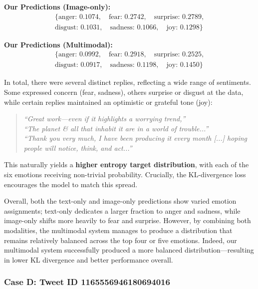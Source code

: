 \noindent\textbf{Our Predictions (Image-only):}
\[
\begin{aligned}
\{\text{anger: } 0.1074, \quad \text{fear: } 0.2742, \quad \text{surprise: } 0.2789, \\
\text{disgust: } 0.1031, \quad \text{sadness: } 0.1066, \quad \text{joy: } 0.1298\}
\end{aligned}
\]

\noindent\textbf{Our Predictions (Multimodal):}
\[
\begin{aligned}
\{\text{anger: } 0.0992, \quad \text{fear: } 0.2918, \quad \text{surprise: } 0.2525, \\
\text{disgust: } 0.0917, \quad \text{sadness: } 0.1198, \quad \text{joy: } 0.1450\}
\end{aligned}
\]

In total, there were several distinct replies, reflecting a wide range of sentiments. Some expressed concern (fear, sadness), others surprise or disgust at the data, while certain replies maintained an optimistic or grateful tone (joy):

\begin{quote}
\emph{``Great work—even if it highlights a worrying trend,''} \\
\emph{``The planet \& all that inhabit it are in a world of trouble...''} \\
\emph{``Thank you very much, I have been producing it every month [...] hoping people will notice, think, and act...''}
\end{quote}

This naturally yields a \textbf{higher entropy target distribution}, with each of the six emotions receiving non-trivial probability. Crucially, the KL-divergence loss encourages the model to match this spread. 
\newline

Overall, both the text-only and image-only predictions show varied emotion assignments; text-only dedicates a larger fraction to anger and sadness, while image-only shifts more heavily to fear and surprise. However, by combining both modalities, the multimodal system manages to produce a distribution that remains relatively balanced across the top four or five emotions. Indeed, our multimodal system successfully produced a more balanced distribution—resulting in lower KL divergence and better performance overall.

\subsubsection*{Case D: Tweet ID 1165556946180694016}

